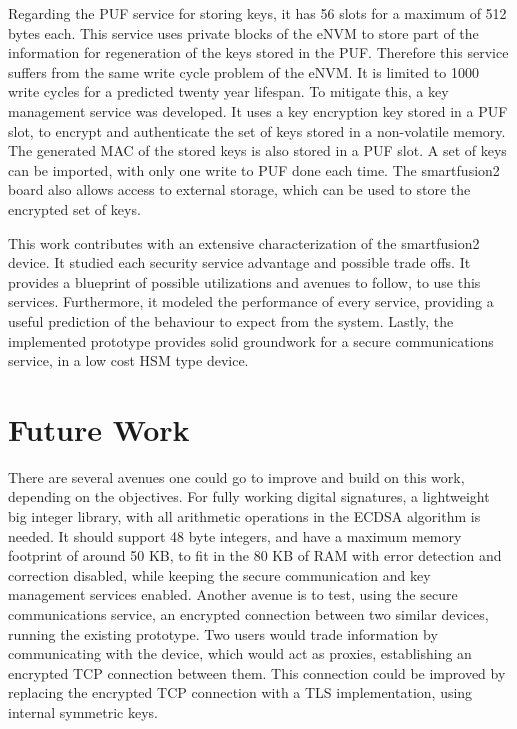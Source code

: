 Regarding the PUF service for storing keys, it has 56 slots for a maximum of 512 bytes each. This service uses private blocks of the eNVM to store part of the information for regeneration of the keys stored in the PUF. Therefore this service suffers from the same write cycle problem of the eNVM. It is limited to 1000 write cycles for a predicted twenty year lifespan. To mitigate this, a key management service was developed. It uses a key encryption key stored in a PUF slot, to encrypt and authenticate the set of keys stored in a non-volatile memory. The generated MAC of the stored keys is also stored in a PUF slot. A set of keys can be imported, with only one write to PUF done each time. The smartfusion2 board also allows access to external storage, which can be used to store the encrypted set of keys.

This work contributes with an extensive characterization of the smartfusion2 device. It studied each security service advantage and possible trade offs. It provides a blueprint of possible utilizations and avenues to follow, to use this services. Furthermore, it modeled the performance of every service, providing a useful prediction of the behaviour to expect from the system. Lastly, the implemented prototype provides solid groundwork for a secure communications service, in a low cost HSM type device.

\section{Future Work} \label{chap:conclusion:future-work}

There are several avenues one could go to improve and build on this work, depending on the objectives. For fully working digital signatures, a lightweight big integer library, with all arithmetic operations in the \ac{ECDSA} algorithm is needed. It should support 48 byte integers, and have a maximum memory footprint of around 50 KB, to fit in the 80 KB of RAM with error detection and correction disabled, while keeping the secure communication and key management services enabled.
Another avenue is to test, using the secure communications service, an encrypted connection between two similar devices, running the existing prototype. Two users would trade information by communicating with the device, which would act as proxies, establishing an encrypted TCP connection between them. This connection could be improved by replacing the encrypted TCP connection with a TLS implementation, using internal symmetric keys.
